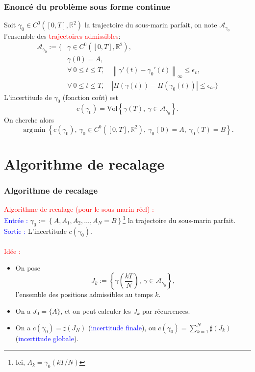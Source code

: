 \documentclass[11pt]{beamer}
\newcommand{\R}{\mathbb{R}}
\DeclareMathOperator*{\argmin}{arg\,min}
\begin{document}
\begin{frame}

\frametitle{Enoncé du problème sous forme continue}

Soit $\gamma_0 \in C^0( [0,T], \R^2)$ la trajectoire du sous-marin parfait, on note $\mathcal{A}_{\gamma_0}$ l'ensemble des \textcolor{red}{trajectoires admissibles}:
\[
	\begin{array}{ll}
		\mathcal{A}_{\gamma_0} :=   \Big\{ &\gamma \in C^0( [0,T], \R^2), \\
			& \gamma(0) = A, \\
			& \forall \ 0 \le t \le T, \quad \left\|  \gamma'(t)  - \gamma_0'(t) \right\|_{\infty} \le \epsilon_v, \\
			& \forall \ 0 \le t \le T, \quad \left| H(\gamma(t))  - H(\gamma_0(t)) \right| \le \epsilon_h. \Big\}
			\end{array}
\]
L'incertitude de $\gamma_0$ (fonction coût) est
\[
	c(\gamma_0) = \text{Vol} \left\{ \gamma(T), \ \gamma \in \mathcal{A}_{\gamma_0} \right\}.
\]
On cherche alors
\[
	\argmin \left\{ c(\gamma_0), \ \gamma_0 \in C^0( [0,T], \R^2), \ \gamma_0(0) = A, \ \gamma_0(T) = B \right\}.
\]

\end{frame}


\section{Algorithme  de recalage}
\begin{frame}

\frametitle{Algorithme de recalage}


\textcolor{red}{Algorithme de recalage (pour le sous-marin réel) :}\\
\indent \textcolor{blue}{Entrée : } $\gamma_0 := \left\{ A, A_1, A_2, \ldots, A_N = B \right\}$\footnote{Ici, $A_k = \gamma_0(kT/N)$} la trajectoire du sous-marin parfait.\\
\indent \textcolor{blue}{Sortie : } L'incertitude $c(\gamma_0)$.\\
~\\

\textcolor{red}{Idée :}
\begin{itemize}
	\item On pose 
	\[
		J_k := \left\{ \gamma \left(\dfrac{kT}{N} \right), \ \gamma \in \mathcal{A}_{\gamma_0} \right\},
	\]
	l'ensemble des positions admissibles au temps $k$.
	\item On a $J_0 = \{ A \}$, et on peut calculer les $J_k$ par récurrences.
	\item On a $c(\gamma_0) = \sharp \left( J_N \right)$ (\textcolor{blue}{incertitude finale}), ou $c(\gamma_0) = \sum_{k=1}^N \sharp \left( J_k \right)$ (\textcolor{blue}{incertitude globale}).
\end{itemize}



\end{frame}
\end{document}
